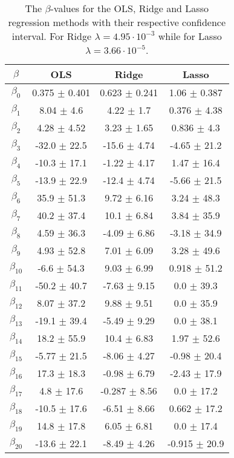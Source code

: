 \documentclass[uio,jmp,amsmath,amssymb,reprint,nofootinbib]{revtex4-1}
\numberwithin{equation}{section}
\begin{document}
\begin{table}
\begin{tabular}{|c|c|c|c|}\hline
\(\beta\) & OLS & Ridge & Lasso \\ \hline
\(\beta_{0}\) & 0.375 \(\pm\) 0.401 & 0.623 \(\pm\) 0.241 & 1.06 \(\pm\) 0.387 \\ \hline
\(\beta_{1}\) & 8.04 \(\pm\) 4.6 & 4.22 \(\pm\) 1.7 & 0.376 \(\pm\) 4.38 \\ \hline
\(\beta_{2}\) & 4.28 \(\pm\) 4.52 & 3.23 \(\pm\) 1.65 & 0.836 \(\pm\) 4.3 \\ \hline
\(\beta_{3}\) & -32.0 \(\pm\) 22.5 & -15.6 \(\pm\) 4.74 & -4.65 \(\pm\) 21.2 \\ \hline
\(\beta_{4}\) & -10.3 \(\pm\) 17.1 & -1.22 \(\pm\) 4.17 & 1.47 \(\pm\) 16.4 \\ \hline
\(\beta_{5}\) & -13.9 \(\pm\) 22.9 & -12.4 \(\pm\) 4.74 & -5.66 \(\pm\) 21.5 \\ \hline
\(\beta_{6}\) & 35.9 \(\pm\) 51.3 & 9.72 \(\pm\) 6.16 & 3.24 \(\pm\) 48.3 \\ \hline
\(\beta_{7}\) & 40.2 \(\pm\) 37.4 & 10.1 \(\pm\) 6.84 & 3.84 \(\pm\) 35.9 \\ \hline
\(\beta_{8}\) & 4.59 \(\pm\) 36.3 & -4.09 \(\pm\) 6.86 & -3.18 \(\pm\) 34.9 \\ \hline
\(\beta_{9}\) & 4.93 \(\pm\) 52.8 & 7.01 \(\pm\) 6.09 & 3.28 \(\pm\) 49.6 \\ \hline
\(\beta_{10}\) & -6.6 \(\pm\) 54.3 & 9.03 \(\pm\) 6.99 & 0.918 \(\pm\) 51.2 \\ \hline
\(\beta_{11}\) & -50.2 \(\pm\) 40.7 & -7.63 \(\pm\) 9.15 & 0.0 \(\pm\) 39.3 \\ \hline
\(\beta_{12}\) & 8.07 \(\pm\) 37.2 & 9.88 \(\pm\) 9.51 & 0.0 \(\pm\) 35.9 \\ \hline
\(\beta_{13}\) & -19.1 \(\pm\) 39.4 & -5.49 \(\pm\) 9.29 & 0.0 \(\pm\) 38.1 \\ \hline
\(\beta_{14}\) & 18.2 \(\pm\) 55.9 & 10.4 \(\pm\) 6.83 & 1.97 \(\pm\) 52.6 \\ \hline
\(\beta_{15}\) & -5.77 \(\pm\) 21.5 & -8.06 \(\pm\) 4.27 & -0.98 \(\pm\) 20.4 \\ \hline
\(\beta_{16}\) & 17.3 \(\pm\) 18.3 & -0.98 \(\pm\) 6.79 & -2.43 \(\pm\) 17.9 \\ \hline
\(\beta_{17}\) & 4.8 \(\pm\) 17.6 & -0.287 \(\pm\) 8.56 & 0.0 \(\pm\) 17.2 \\ \hline
\(\beta_{18}\) & -10.5 \(\pm\) 17.6 & -6.51 \(\pm\) 8.66 & 0.662 \(\pm\) 17.2 \\ \hline
\(\beta_{19}\) & 14.8 \(\pm\) 17.8 & 6.05 \(\pm\) 6.81 & 0.0 \(\pm\) 17.4 \\ \hline
\(\beta_{20}\) & -13.6 \(\pm\) 22.1 & -8.49 \(\pm\) 4.26 & -0.915 \(\pm\) 20.9 \\ \hline
\end{tabular}
\caption{The \(\beta\)-values for the OLS, Ridge and Lasso regression methods with their respective confidence interval. For Ridge \(\lambda = 4.95\cdot 10^{-3}\) while for Lasso \(\lambda = 3.66\cdot 10^{-5}\).}
\label{tab:02}
\end{table}
\end{document}
